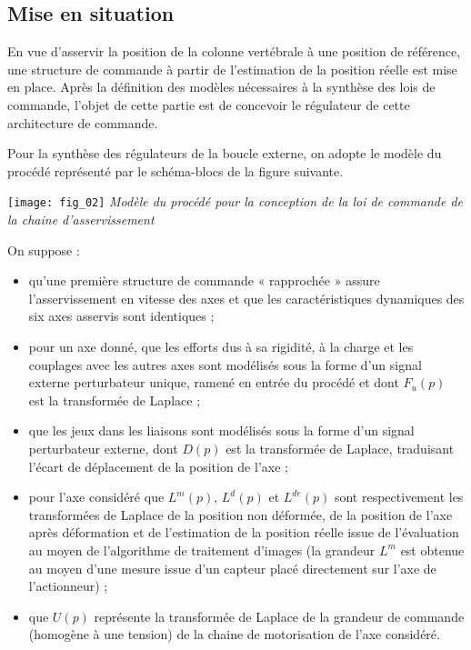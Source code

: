\begin{multicols}{2}
\section*{Mise en situation}
\begin{obj}
En vue d’asservir la position de la colonne vertébrale à une position de référence, une structure de
commande à partir de l’estimation de la position réelle est mise en place. Après la définition des
modèles nécessaires à la synthèse des lois de commande, l’objet de cette partie est de concevoir le
régulateur de cette architecture de commande.

\end{obj}


Pour la synthèse des régulateurs de la boucle externe, on adopte le modèle du procédé représenté par le schéma-blocs de la figure suivante. 

\begin{center}
\texttt{[image: fig\_02]}
\textit{Modèle du procédé pour la conception de la loi de commande
de la chaine d’asservissement}
\end{center}

On suppose :
\begin{itemize}
\item qu’une première structure de commande « rapprochée » assure l’asservissement en vitesse des axes et que les caractéristiques dynamiques des six axes asservis sont identiques ;
\item pour un axe donné, que les efforts dus à sa rigidité, à la charge et les couplages avec les autres axes sont modélisés sous la forme d’un signal externe perturbateur unique, ramené en entrée du procédé et dont $F_u(p)$ est la transformée de Laplace ;
\item que les jeux dans les liaisons sont modélisés sous la forme d’un signal perturbateur externe, dont $D(p)$ est la transformée de Laplace, traduisant l’écart de déplacement de la position de l’axe ;
\item pour l’axe considéré que $L^m(p)$, $L^d(p)$ et $L^{de}(p)$ sont respectivement les transformées de Laplace de la position non déformée, de la position de l’axe après déformation et de l’estimation de la position réelle issue de l’évaluation au moyen de l’algorithme de traitement d’images (la grandeur $L^m$ est obtenue au moyen d’une mesure issue d’un capteur placé directement sur l’axe de l’actionneur) ;
\item que $U(p)$ représente la transformée de Laplace de la grandeur de commande (homogène à une tension) de la chaine de motorisation de l’axe considéré.
\end{itemize}




\end{multicols}
